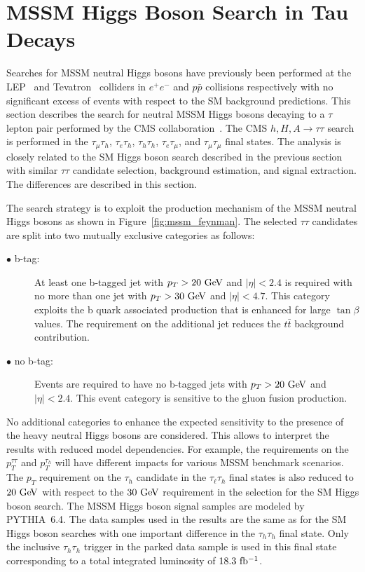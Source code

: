 \newpage
 
\section{MSSM Higgs Boson Search in Tau Decays}

Searches for MSSM neutral Higgs bosons have previously been performed at the LEP~\cite{Schael:2006cr} and Tevatron~\cite{Aaltonen:2009vf,Abazov:2010ci,Abazov:2011jh,Aaltonen:2011nh} colliders in $e^+e^-$ and $p\bar{p}$ collisions respectively with no significant excess of events with respect to the SM background predictions. This section describes the search for neutral MSSM Higgs bosons decaying to a $\tau$ lepton pair performed by the CMS collaboration~\cite{Khachatryan:2014wca}. The CMS $h,H,A\rightarrow\tau\tau$ search is performed in the $\tau_{\mu}\tau_h$, $\tau_e\tau_h$, $\tau_h\tau_h$, $\tau_e\tau_{\mu}$, and $\tau_{\mu}\tau_{\mu}$ final states.  The analysis is closely related to the SM Higgs boson search described in the previous section with similar $\tau\tau$ candidate selection, background estimation, and signal extraction. The differences are described in this section.

The search strategy is to exploit the production mechanism of the MSSM neutral Higgs bosons as shown in Figure~\ref{fig:mssm_feynman}. The selected $\tau\tau$ candidates are split into two mutually exclusive categories as follows:

\begin{description}
\item[$\bullet$ b-tag:] At least one b-tagged jet with $p_T>20~\mathrm{Ge\kern -0.1em V}$ and $|\eta|<2.4$ is required with no more than one jet with $p_{T}>30~\mathrm{Ge\kern -0.1em V}$ and $|\eta|<4.7$. This category exploits the b quark associated production that is enhanced for large $\tan\beta$ values. The requirement on the additional jet reduces the $t\bar{t}$ background contribution.
\item[$\bullet$ no b-tag:] Events are required to have no b-tagged jets with $p_{T}>20~\mathrm{Ge\kern -0.1em V}$ and $|\eta|<2.4$. This event category is sensitive to the gluon fusion production.
\end{description}  

No additional categories to enhance the expected sensitivity to the presence of the heavy neutral Higgs bosons are considered. This allows to interpret the results with reduced model dependencies. For example, the requirements on the $p_{T}^{\tau\tau}$ and $p_{T}^{\tau_h}$ will have  different impacts for various MSSM benchmark scenarios.  The $p_{T}$ requirement on the $\tau_h$ candidate in the $\tau_{\ell}\tau_h$ final states is also reduced to $20~\mathrm{Ge\kern -0.1em V}$ with respect to the $30~\mathrm{Ge\kern -0.1em V}$ requirement in the selection for the SM Higgs boson search. The MSSM  Higgs boson signal samples are modeled by PYTHIA~6.4. The data samples used in the results are the same as for the SM Higgs boson searches with one important difference in the $\tau_h\tau_h$ final state. Only the inclusive $\tau_h\tau_h$ trigger in the parked data sample is used in this final state corresponding to a total integrated luminosity of $18.3~\mathrm{fb^{-1}}$.   

